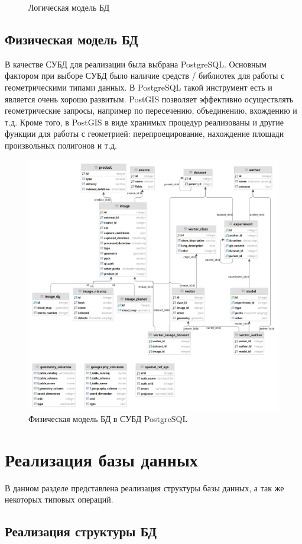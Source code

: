 \documentclass[a4paper]{article}
\begin{document}
\begin{figure}[h]
	\centering
	
	\caption{Логическая модель БД}
\end{figure}


\subsection{Физическая модель БД}
В качестве СУБД для реализации была выбрана PostgreSQL.
Основным фактором при выборе СУБД было наличие средств / библиотек для работы с геометрическими типами данных.
В PostgreSQL такой инструмент есть и является очень хорошо развитым.
PostGIS позволяет эффективно осуществлять геометрические запросы, например по пересечению, объединению, вхождению и т.д.
Кроме того, в PostGIS в виде хранимых процедур реализованы и другие функции для работы с геометрией: перепроецирование, нахождение площади произвольных полигонов и т.д.

\begin{figure}[h]
	\centering
	\includegraphics[width=\columnwidth]{./images/Physics.png}
	\caption{Физическая модель БД в СУБД PostgreSQL}
\end{figure}


\section{Реализация базы данных}
В данном разделе представлена реализация структуры базы данных, а так же некоторых типовых операций.

\subsection{Реализация структуры БД}


	
\end{document}
